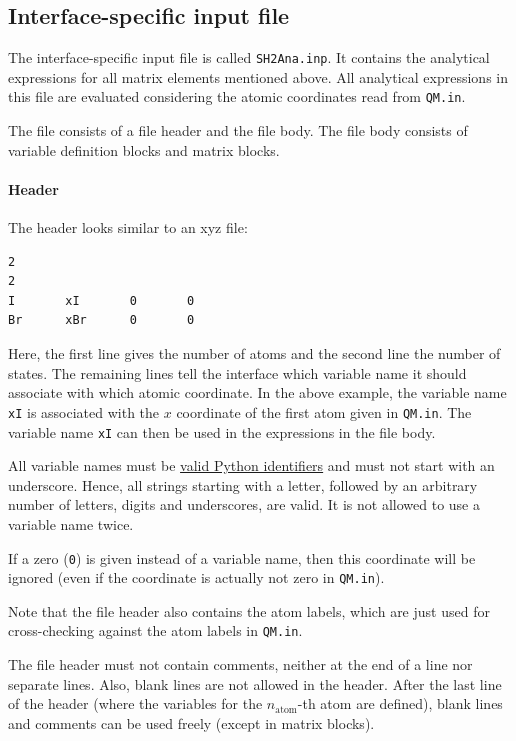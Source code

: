 \documentclass[a4paper,11pt,DIV=15,openany,twoside=false]{scrbook}
\newcommand{\ttt}[1]{\texttt{#1}}
\newenvironment{example}{
  \vspace{0mm}
  \definecolor{shadecolor}{HTML}{BBDDFF}
  \begin{shaded}
  \begin{minipage}{0.9\textwidth}
}{
  \end{minipage}
  \end{shaded}
}
\begin{document}
\subsection{Interface-specific input file}

The interface-specific input file is called \ttt{SH2Ana.inp}. It contains the analytical expressions for all matrix elements mentioned above. All analytical expressions in this file are evaluated considering the atomic coordinates read from \ttt{QM.in}.

The file consists of a file header and the file body. The file body consists of variable definition blocks and matrix blocks.

\paragraph{Header} 

The header looks similar to an xyz file:
\begin{example}
  \begin{verbatim}
2
2
I       xI       0       0
Br      xBr      0       0
  \end{verbatim}
\end{example}
Here, the first line gives the number of atoms and the second line the number of states. The remaining lines tell the interface which variable name it should associate with which atomic coordinate. In the above example, the variable name \ttt{xI} is associated with the $x$ coordinate of the first atom given in \ttt{QM.in}. The variable name \ttt{xI} can then be used in the expressions in the file body. 

All variable names must be \href{https://docs.python.org/2/reference/lexical_analysis.html#identifiers}{valid Python identifiers} and must not start with an underscore. Hence, all strings starting with a letter, followed by an arbitrary number of letters, digits and underscores, are valid. It is not allowed to use a variable name twice.

If a zero (\ttt{0}) is given instead of a variable name, then this coordinate will be ignored (even if the coordinate is actually not zero in \ttt{QM.in}). 

Note that the file header also contains the atom labels, which are just used for cross-checking against the atom labels in \ttt{QM.in}.

The file header must not contain comments, neither at the end of a line nor separate lines. Also, blank lines are not allowed in the header. After the last line of the header (where the variables for the $n_{\text{atom}}$-th atom are defined), blank lines and comments can be used freely (except in matrix blocks).
\end{document}
